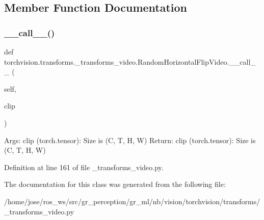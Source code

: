 \subsection{Member Function Documentation}
\mbox{\label{classtorchvision_1_1transforms_1_1__transforms__video_1_1RandomHorizontalFlipVideo_a26dae6d5c1590be299747ea94b6aa4b8}} 
\subsubsection{\texorpdfstring{\+\_\+\+\_\+call\+\_\+\+\_\+()}{\_\_call\_\_()}}
{\footnotesize\ttfamily def torchvision.\+transforms.\+\_\+transforms\+\_\+video.\+Random\+Horizontal\+Flip\+Video.\+\_\+\+\_\+call\+\_\+\+\_\+ (\begin{DoxyParamCaption}\item[{}]{self,  }\item[{}]{clip }\end{DoxyParamCaption})}

\begin{DoxyVerb}Args:
    clip (torch.tensor): Size is (C, T, H, W)
Return:
    clip (torch.tensor): Size is (C, T, H, W)
\end{DoxyVerb}
 

Definition at line 161 of file \+\_\+transforms\+\_\+video.\+py.



The documentation for this class was generated from the following file\+:\begin{DoxyCompactItemize}
\item 
/home/jose/ros\+\_\+ws/src/gr\+\_\+perception/gr\+\_\+ml/nb/vision/torchvision/transforms/\+\_\+transforms\+\_\+video.\+py\end{DoxyCompactItemize}
